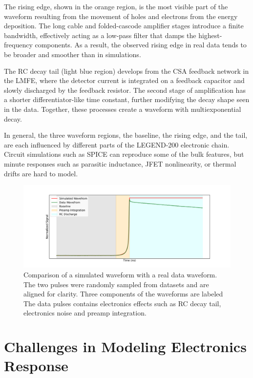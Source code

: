 The rising edge, shown in the orange region, is the most visible part of the waveform resulting from the movement of holes and electrons from the energy deposition. The long cable and folded-cascode amplifier stages introduce a finite bandwidth, effectively acting as a low-pass filter that damps the highest-frequency components. As a result, the observed rising edge in real data tends to be broader and smoother than in simulations. 

The RC decay tail (light blue region) develops from the CSA feedback network in the LMFE, where the detector current is integrated on a feedback capacitor and slowly discharged by the feedback resistor. The second stage of amplification has a shorter differentiator-like time constant, further modifying the decay shape seen in the data. Together, these processes create a waveform with multiexponential decay. 


In general, the three waveform regions, the baseline, the rising edge, and the tail, are each influenced by different parts of the LEGEND-200 electronic chain. Circuit simulations such as SPICE can reproduce some of the bulk features, but minute responses such as parasitic inductance, JFET nonlinearity, or thermal drifts are hard to model.

\begin{figure}[!htb]%
    \includegraphics[width=\linewidth,trim={4cm 0pc 3.5cm 0pc},clip]{ch6/figs/wf_comp_sim_data.pdf}
    \caption{Comparison of a simulated waveform with a real data waveform. The two pulses were randomly sampled from datasets and are aligned for clarity. Three components of the waveforms are labeled The data pulses contains electronics effects such as RC decay tail, electronics noise and preamp integration.}
    \label{fig:sim_data_comp}
\end{figure}

\section{Challenges in Modeling Electronics Response}

